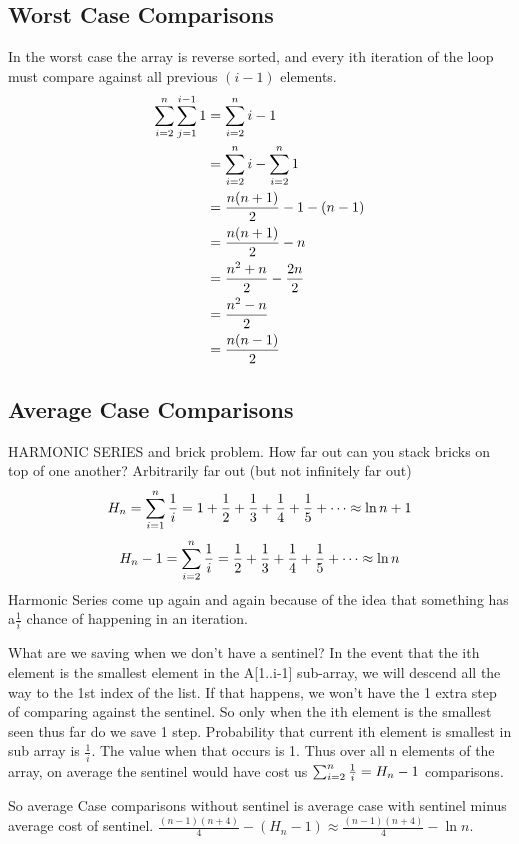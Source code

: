 \documentclass[english, 10pt]{article}
\begin{document}
\subsection{Worst Case Comparisons}
In the worst case the array is reverse sorted, and every ith iteration of the loop must compare against all previous $(i-1)$  elements.
\begin{align*}
    \sum_{i=2}^{n}\sum_{j=1}^{i-1}1 &= \sum_{i=2}^{n} i-1 \\
    &= \sum_{i=2}^{n} i - \sum_{i=2}^{n} 1 \\
    &= \frac{n(n+1)}{2} -1 -(n-1) \\
    &= \frac{n(n+1)}{2} -n \\
    &= \frac{n^2 + n}{2} -\frac{2n}{2} \\
    &= \frac{n^2 - n}{2} \\
    &= \frac{n(n-1)}{2} \\
\end{align*}


\subsection{Average Case Comparisons}
\begin{rem}
HARMONIC SERIES and brick problem.
How far out can you stack bricks on top of one another? Arbitrarily far out (but not infinitely far out)
$$H_n = \sum_{i=1}^{n}\frac{1}{i} = 1+\frac{1}{2}+\frac{1}{3}+\frac{1}{4}+\frac{1}{5}+\cdots \approx \ln{n}+1$$
$$H_n -1 = \sum_{i=2}^{n}\frac{1}{i} = \frac{1}{2}+\frac{1}{3}+\frac{1}{4}+\frac{1}{5}+\cdots \approx \ln{n}$$
Harmonic Series come up again and again because of the idea that something has a$ \frac{1}{i}$ chance of happening in an iteration.
\end{rem}
What are we saving when we don't have a sentinel? In the event that the ith element is the smallest element in the A[1..i-1] sub-array, we will descend all
the way to the 1st index of the list. If that happens, we won't have the 1 extra step of comparing against the sentinel. So only when the ith element is
the smallest seen thus far do we save 1 step.
Probability that current ith element is smallest in sub array is $\frac{1}{i}$. The value when that occurs is 1.
Thus over all n elements of the array, on average the sentinel would have cost us $\sum_{i=2}^{n}\frac{1}{i} = H_n -1$ comparisons.

So average Case comparisons without sentinel is average case with sentinel minus average cost of sentinel.
$\frac{(n-1)(n+4)}{4}-(H_n -1) \approx \frac{(n-1)(n+4)}{4}-\ln{n}$.
\end{document}
